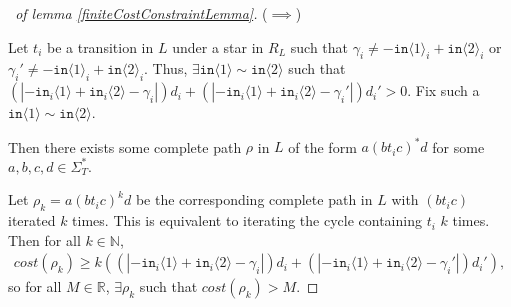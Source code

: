 \documentclass[12pt]{article}
\newcommand{\NN}{\mathbb{N}}
\newcommand{\RR}{\mathbb{R}}
\newcommand{\brangle}[1]{\langle#1 \rangle}
\theoremstyle{definition}
\begin{document}
\begin{proof}[\proofname~of lemma \ref{finiteCostConstraintLemma}]
    ($\implies$)

    Let $t_i$ be a transition in $L$ under a star in $R_L$ such that $\gamma_i\neq -\texttt{in}\brangle{1}_i+\texttt{in}\brangle{2}_i$ or $\gamma_i'\neq  -\texttt{in}\brangle{1}_i+\texttt{in}\brangle{2}_i$.     Thus, $\exists \texttt{in}\brangle{1}\sim \texttt{in}\brangle{2}$ such that $(|-\texttt{in}_i\brangle{1}+\texttt{in}_i\brangle{2}-\gamma_i|)d_i+(|-\texttt{in}_i\brangle{1}+\texttt{in}_i\brangle{2}-\gamma_i'|)d_i'>0$.
    Fix such a $\texttt{in}\brangle{1}\sim \texttt{in}\brangle{2}$. 

    Then there exists some complete path $\rho$ in $L$ of the form $a(bt_ic)^*d$ for some $a, b, c, d\in \Sigma_T^*$.
    
    Let $\rho_k=a(bt_ic)^kd$ be the corresponding complete path in $L$ with $(bt_ic)$ iterated $k$ times. This is equivalent to iterating the cycle containing $t_i$ $k$ times. Then for all $k\in \NN$, \begin{align*}
        cost(\rho_k) \geq k((|-\texttt{in}_i\brangle{1}+\texttt{in}_i\brangle{2}-\gamma_i|)d_i+(|-\texttt{in}_i\brangle{1}+\texttt{in}_i\brangle{2}-\gamma_i'|)d_i'),
    \end{align*}
    so for all $M\in \RR$, $\exists \rho_k$ such that $cost(\rho_k) > M$.
\end{proof}
\end{document}
